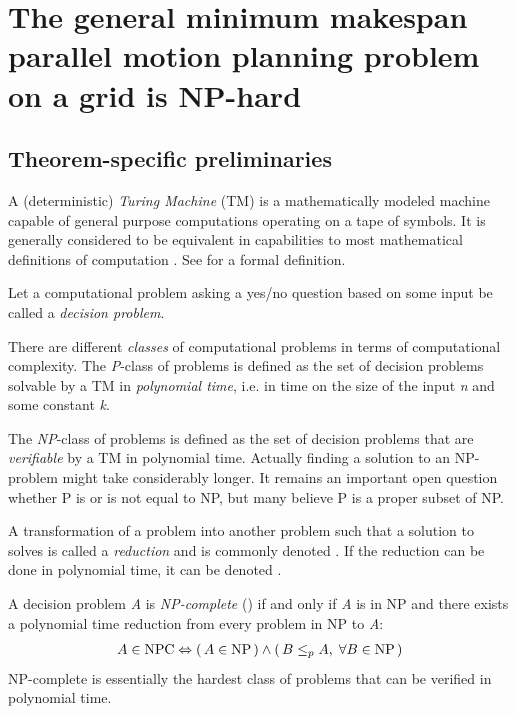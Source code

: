 \section{The general minimum makespan parallel motion planning problem on a grid is NP-hard}\label{chapter:main_proof}

\cite{siamcomp/DemaineFKMS19} \cite{corr/YuL15c}

\subsection{Theorem-specific preliminaries}

A (deterministic) \emph{Turing Machine} (TM) is a mathematically modeled machine capable of general purpose computations operating on a tape of symbols. It is generally considered to be equivalent in capabilities to most mathematical definitions of computation \cite{aw/HopcroftU79}. See \cite{aw/HopcroftU79} for a formal definition.

Let a computational problem asking a yes/no question based on some input be called a \emph{decision problem}.

There are different \emph{classes} of computational problems in terms of computational complexity. The \emph{P}-class of problems is defined as the set of decision problems solvable by a TM in \emph{polynomial time}, i.e. in  time on the size of the input \emph{n} and some constant \emph{k}.

The \emph{NP}-class of problems is defined as the set of decision problems that are \emph{verifiable} by a TM in polynomial time. Actually finding a solution to an NP-problem might take considerably longer. It remains an important open question whether P is or is not equal to NP, but many believe P is a proper subset of NP.

A transformation of a problem  into another problem  such that a solution to  solves  is called a \emph{reduction} and is commonly denoted . If the reduction can be done in polynomial time, it can be denoted .

\begin{definition}\label{def:np_complete}
	A decision problem \emph{A} is \emph{NP-complete} () if and only if \emph{A} is in NP and there exists a polynomial time reduction from every problem in NP to \emph{A}:
	\begin{align*}
		A \in \text{NPC} \Leftrightarrow (\, A \in \text{NP} \,) \land (\, B \leq_p A, \; \forall B \in \text{NP} \,)
	\end{align*}
	NP-complete is essentially the hardest class of problems that can be verified in polynomial time. 
\end{definition}

